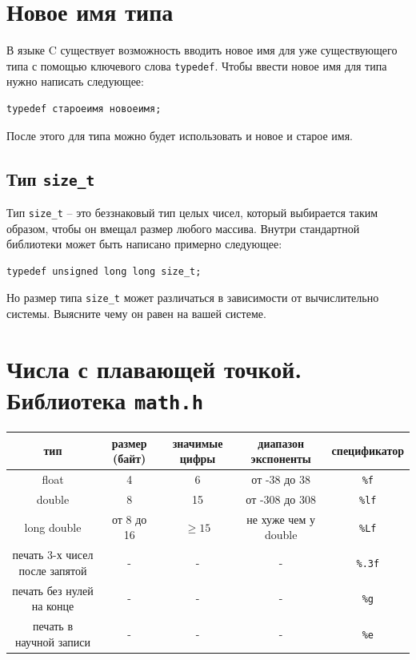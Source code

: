 \documentclass{article}
\begin{document}
\section*{Новое имя типа}
В языке C существует возможность вводить новое имя для уже существующего типа с помощью ключевого слова \texttt{typedef}. Чтобы ввести новое имя для типа нужно написать следующее:
\begin{lstlisting}
typedef староеимя новоеимя;
\end{lstlisting}
После этого для типа можно будет использовать и новое и старое имя.


\subsection*{Тип \texttt{size\_t}} 
Тип \texttt{size\_t} -- это беззнаковый тип целых чисел, который выбирается таким образом, чтобы он вмещал размер любого массива. Внутри стандартной библиотеки может быть написано примерно следующее:
\begin{lstlisting}
typedef unsigned long long size_t;
\end{lstlisting}
Но размер типа \texttt{size\_t} может различаться в зависимости от вычислительно системы. Выясните чему он равен на вашей системе.

\newpage
\section*{Числа с плавающей точкой. Библиотека \texttt{math.h}}
\begin{center}
\begin{tabular}{ c c c c c }
 тип & размер (байт) & значимые цифры & диапазон экспоненты & спецификатор \\ \hline
 float             & 4          & 6  & от -38 до 38    & \texttt{\%f} \\ 
 double            & 8          & 15 & от -308 до 308  & \texttt{\%lf}  \\  
 long double       & от 8 до 16 & $\ge 15$  & не хуже чем у double  & \texttt{\%Lf}  \\ \hline
 печать 3-х чисел после запятой & -          & -  & -              & \texttt{\%.3f} \\
 печать без нулей на конце & -          & -  & -              & \texttt{\%g} \\
 печать в научной записи   & -          & -  & -              & \texttt{\%e} \\
\end{tabular}
\end{center}
\end{document}
